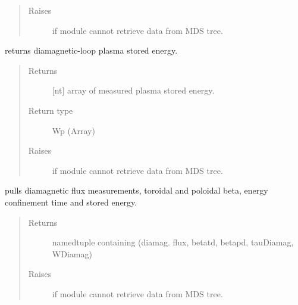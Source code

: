 \documentclass[letterpaper,10pt,english]{sphinxmanual}
\begin{document}
\begin{fulllineitems}
\begin{fulllineitems}
\begin{quote}
\begin{description}
\item[{Raises}] \leavevmode
{} \textendash{} if module cannot retrieve data from MDS tree.

\end{description}\end{quote}

\end{fulllineitems}


\begin{fulllineitems}
\label{\detokenize{eqtools:eqtools.EFIT.EFITTree.getDiamagWp}}
returns diamagnetic-loop plasma stored energy.
\begin{quote}\begin{description}
\item[{Returns}] \leavevmode
{[}nt{]} array of measured plasma stored energy.

\item[{Return type}] \leavevmode
Wp (Array)

\item[{Raises}] \leavevmode
{} \textendash{} if module cannot retrieve data from MDS tree.

\end{description}\end{quote}

\end{fulllineitems}


\begin{fulllineitems}
\label{\detokenize{eqtools:eqtools.EFIT.EFITTree.getDiamag}}
pulls diamagnetic flux measurements, toroidal and poloidal beta,
energy confinement time and stored energy.
\begin{quote}\begin{description}
\item[{Returns}] \leavevmode
namedtuple containing (diamag. flux, betatd, betapd, tauDiamag, WDiamag)

\item[{Raises}] \leavevmode
{} \textendash{} if module cannot retrieve data from MDS tree.


\end{description}
\end{quote}
\end{fulllineitems}
\end{fulllineitems}
\end{document}
